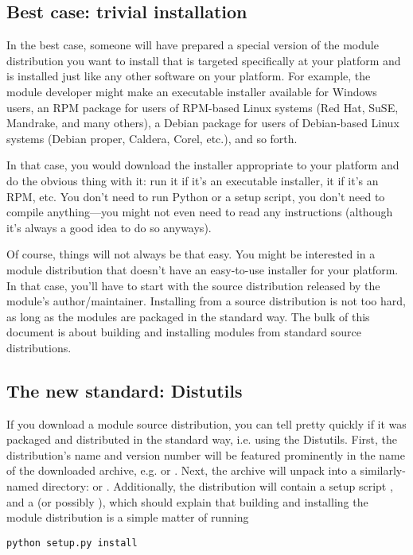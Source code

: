 \documentclass{howto}
\begin{document}
\subsection{Best case: trivial installation}
\label{trivial-install}

In the best case, someone will have prepared a special version of the
module distribution you want to install that is targeted specifically at
your platform and is installed just like any other software on your
platform.  For example, the module developer might make an executable
installer available for Windows users, an RPM package for users of
RPM-based Linux systems (Red Hat, SuSE, Mandrake, and many others), a
Debian package for users of Debian-based Linux systems (Debian proper,
Caldera, Corel, etc.), and so forth.

In that case, you would download the installer appropriate to your
platform and do the obvious thing with it: run it if it's an executable
installer,  it if it's an RPM, etc.  You don't need
to run Python or a setup script, you don't need to compile
anything---you might not even need to read any instructions (although
it's always a good idea to do so anyways).

Of course, things will not always be that easy.  You might be interested
in a module distribution that doesn't have an easy-to-use installer for
your platform.  In that case, you'll have to start with the source
distribution released by the module's author/maintainer.  Installing
from a source distribution is not too hard, as long as the modules are
packaged in the standard way.  The bulk of this document is about
building and installing modules from standard source distributions.


\subsection{The new standard: Distutils}
\label{new-standard}

If you download a module source distribution, you can tell pretty
quickly if it was packaged and distributed in the standard way, i.e.
using the Distutils.  First, the distribution's name and version number
will be featured prominently in the name of the downloaded archive, e.g.
 or .  Next, the archive
will unpack into a similarly-named directory:  or
.  Additionally, the distribution will contain a
setup script , and a  (or possibly
), which should explain that building and installing the
module distribution is a simple matter of running
\begin{verbatim}
python setup.py install
\end{verbatim}
\end{document}
